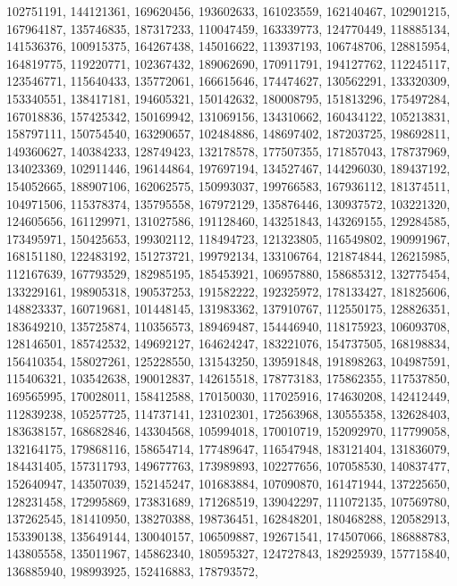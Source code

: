 {{    102751191, 144121361, 169620456, 193602633, 161023559, 162140467,
    102901215, 167964187, 135746835, 187317233, 110047459, 163339773,
    124770449, 118885134, 141536376, 100915375, 164267438, 145016622,
    113937193, 106748706, 128815954, 164819775, 119220771, 102367432,
    189062690, 170911791, 194127762, 112245117, 123546771, 115640433,
    135772061, 166615646, 174474627, 130562291, 133320309, 153340551,
    138417181, 194605321, 150142632, 180008795, 151813296, 175497284,
    167018836, 157425342, 150169942, 131069156, 134310662, 160434122,
    105213831, 158797111, 150754540, 163290657, 102484886, 148697402,
    187203725, 198692811, 149360627, 140384233, 128749423, 132178578,
    177507355, 171857043, 178737969, 134023369, 102911446, 196144864,
    197697194, 134527467, 144296030, 189437192, 154052665, 188907106,
    162062575, 150993037, 199766583, 167936112, 181374511, 104971506,
    115378374, 135795558, 167972129, 135876446, 130937572, 103221320,
    124605656, 161129971, 131027586, 191128460, 143251843, 143269155,
    129284585, 173495971, 150425653, 199302112, 118494723, 121323805,
    116549802, 190991967, 168151180, 122483192, 151273721, 199792134,
    133106764, 121874844, 126215985, 112167639, 167793529, 182985195,
    185453921, 106957880, 158685312, 132775454, 133229161, 198905318,
    190537253, 191582222, 192325972, 178133427, 181825606, 148823337,
    160719681, 101448145, 131983362, 137910767, 112550175, 128826351,
    183649210, 135725874, 110356573, 189469487, 154446940, 118175923,
    106093708, 128146501, 185742532, 149692127, 164624247, 183221076,
    154737505, 168198834, 156410354, 158027261, 125228550, 131543250,
    139591848, 191898263, 104987591, 115406321, 103542638, 190012837,
    142615518, 178773183, 175862355, 117537850, 169565995, 170028011,
    158412588, 170150030, 117025916, 174630208, 142412449, 112839238,
    105257725, 114737141, 123102301, 172563968, 130555358, 132628403,
    183638157, 168682846, 143304568, 105994018, 170010719, 152092970,
    117799058, 132164175, 179868116, 158654714, 177489647, 116547948,
    183121404, 131836079, 184431405, 157311793, 149677763, 173989893,
    102277656, 107058530, 140837477, 152640947, 143507039, 152145247,
    101683884, 107090870, 161471944, 137225650, 128231458, 172995869,
    173831689, 171268519, 139042297, 111072135, 107569780, 137262545,
    181410950, 138270388, 198736451, 162848201, 180468288, 120582913,
    153390138, 135649144, 130040157, 106509887, 192671541, 174507066,
    186888783, 143805558, 135011967, 145862340, 180595327, 124727843,
    182925939, 157715840, 136885940, 198993925, 152416883, 178793572,
}}
